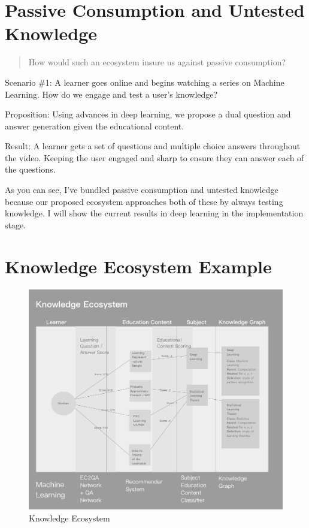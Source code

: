 \documentclass[]{book}
\theoremstyle{definition}
\theoremstyle{definition}
\theoremstyle{definition}
\theoremstyle{remark}
\begin{document}
\section{Passive Consumption and Untested
Knowledge}\label{passive-consumption-and-untested-knowledge}

\begin{quote}
How would such an ecosystem insure us against passive consumption?
\end{quote}

Scenario \#1: A learner goes online and begins watching a series on
Machine Learning. How do we engage and test a user's knowledge?

Proposition: Using advances in deep learning, we propose a dual question
and answer generation given the educational content.

Result: A learner gets a set of questions and multiple choice answers
throughout the video. Keeping the user engaged and sharp to ensure they
can answer each of the questions.

As you can see, I've bundled passive consumption and untested knowledge
because our proposed ecosystem approaches both of these by always
testing knowledge. I will show the current results in deep learning in
the implementation stage.

\section{Knowledge Ecosystem Example}\label{knowledge-ecosystem-example}

\begin{figure}
\centering
\includegraphics{img/knowledgeEcosystem.png}
\caption{Knowledge Ecosystem}
\end{figure}
\end{document}
